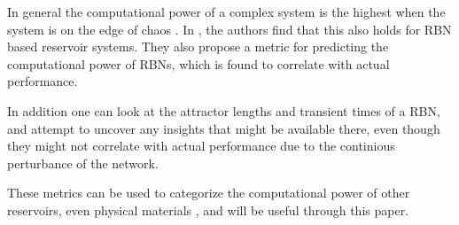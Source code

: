 In general the computational power of a complex system is the highest when the system is on the edge of chaos \cite{langton3computation}.
In \cite{rbn-reservoir}, the authors find that this also holds for RBN based reservoir systems.
They also propose a metric for predicting the computational power of RBNs,
which is found to correlate with actual performance.

In addition one can look at the attractor lengths and transient times of a RBN,
and attempt to uncover any insights that might be available there,
even though they might not correlate with actual performance due to the continious perturbance of the network.

These metrics can be used to categorize the computational power of other reservoirs,
even physical materials \cite{miller2002evolution},
and will be useful through this paper.
